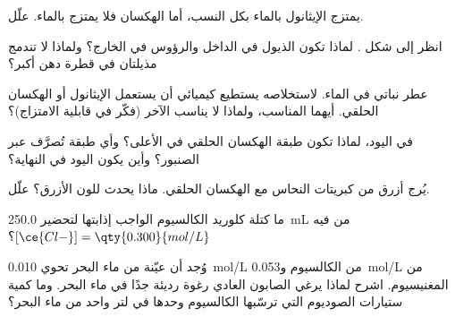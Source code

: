 \begin{exercise}[$\star\star$]\label{exo:g11:dissolution:7}
يمتزج الإيثانول  بالماء بكل النسب، أما الهكسان
 فلا يمتزج بالماء. علّل.
\end{exercise}

\begin{exercise}[$\star\star$]\label{exo:g11:dissolution:8}
انظر إلى شكل . لماذا تكون الذيول في الداخل والرؤوس في الخارج؟ ولماذا لا
تندمج مذيلتان في قطرة دهن أكبر؟
\end{exercise}

\begin{exercise}[$\star\star$]\label{exo:g11:dissolution:9}
عطر نباتي  في الماء. لاستخلاصه يستطيع كيميائي أن يستعمل الإيثانول أو الهكسان
الحلقي. أيهما المناسب، ولماذا لا يناسب الآخر (فكّر في
قابلية الامتزاج)؟
\end{exercise}

\begin{exercise}[$\star\star$]\label{exo:g11:dissolution:10}
في  اليود، لماذا تكون طبقة الهكسان الحلقي في الأعلى؟ وأي طبقة تُصرَّف عبر
الصنبور؟ وأين يكون اليود في النهاية؟
\end{exercise}

\begin{exercise}[$\star\star$]\label{exo:g11:dissolution:11}
يُرج  أزرق من كبريتات النحاس مع الهكسان الحلقي. ماذا يحدث للون الأزرق؟
علّل.
\end{exercise}

\begin{exercise}[$\star\star\star$]\label{exo:g11:dissolution:12}
ما كتلة كلوريد الكالسيوم الواجب إذابتها لتحضير \qty{250.0}{mL}
من  فيه $[\ce{Cl-}] = \qty{0.300}{mol/L}$؟
\end{exercise}

\begin{exercise}[$\star\star\star$]\label{exo:g11:dissolution:13}
وُجد أن عيّنة من ماء البحر تحوي \qty{0.010}{mol/L} من  الكالسيوم
و\qty{0.053}{mol/L} من  المغنيسيوم. اشرح لماذا يرغي الصابون العادي
رغوة رديئة جدًا في ماء البحر. وما كمية ستيارات الصوديوم التي ترسّبها 
الكالسيوم وحدها في لتر واحد من ماء البحر؟
\end{exercise}

